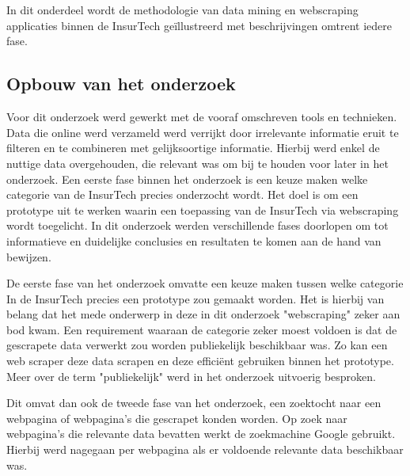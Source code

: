 
\chapter{}
\label{ch:methodologie}


In dit onderdeel wordt de methodologie van data mining en webscraping applicaties binnen de InsurTech geïllustreerd met beschrijvingen omtrent iedere fase.

\section{Opbouw van het onderzoek}
Voor dit onderzoek werd gewerkt met de vooraf omschreven tools en technieken.
Data die online werd verzameld werd verrijkt door irrelevante informatie eruit te filteren en te combineren met gelijksoortige informatie. Hierbij werd enkel de nuttige data overgehouden, die relevant was om bij te houden voor later in het onderzoek.
Een eerste fase binnen het onderzoek is een keuze maken welke categorie van de InsurTech precies onderzocht wordt. Het doel is om een prototype uit te werken waarin een toepassing van de InsurTech via webscraping wordt toegelicht.
In dit onderzoek werden verschillende fases doorlopen om tot informatieve en duidelijke conclusies en resultaten te komen aan de hand van bewijzen.

De eerste fase van het onderzoek omvatte een keuze maken tussen welke categorie In de InsurTech precies een prototype zou gemaakt worden. Het is hierbij van belang dat het mede onderwerp in deze in dit onderzoek "webscraping" zeker aan bod kwam. Een requirement waaraan de categorie zeker moest voldoen is dat de gescrapete data verwerkt zou worden publiekelijk beschikbaar was. 
Zo kan een web scraper deze data scrapen en deze efficiënt gebruiken binnen het prototype. 
Meer over de term "publiekelijk" werd in het onderzoek uitvoerig besproken.

Dit omvat dan ook de tweede fase van het onderzoek, een zoektocht naar een webpagina of webpagina's die gescrapet konden worden.
Op zoek naar webpagina's die relevante data bevatten werkt de zoekmachine Google gebruikt. Hierbij werd nagegaan per webpagina als er voldoende relevante data beschikbaar was.

